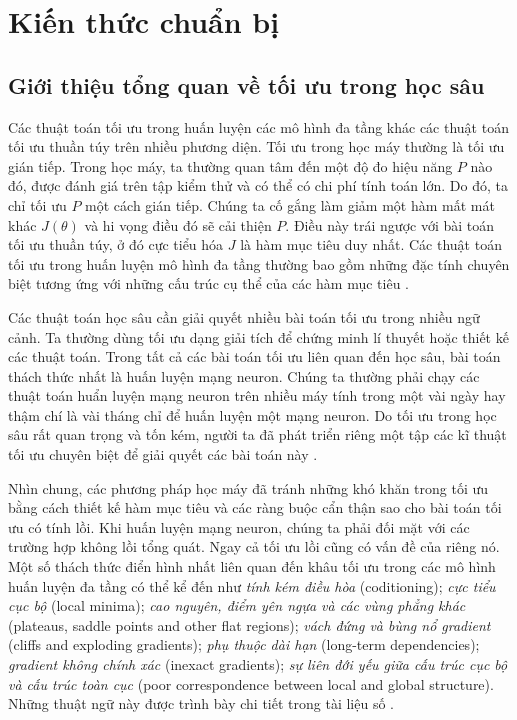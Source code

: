 \documentclass[11pt,oneside,a4paper]{report}
\theoremstyle{definition}
\begin{document}
\tableofcontents
\newpage
\chapter{Kiến thức chuẩn bị}
\section{Giới thiệu tổng quan về tối ưu trong học sâu}

Các thuật toán tối ưu trong huấn luyện các mô hình đa tầng khác các thuật toán tối ưu thuần túy trên nhiều phương diện. Tối ưu trong học máy thường là tối ưu gián tiếp. Trong học máy, ta thường quan tâm đến một độ đo hiệu năng $P$ nào đó, được đánh giá trên tập kiểm thử và có thể có chi phí tính toán lớn. Do đó, ta chỉ tối ưu $P$ một cách gián tiếp. Chúng ta cố gắng làm giảm một hàm mất mát khác $J(\theta)$ và hi vọng điều đó sẽ cải thiện $P$. Điều này trái ngược với bài toán tối ưu thuần túy, ở đó cực tiểu hóa $J$ là hàm mục tiêu duy nhất. Các thuật toán tối ưu trong huấn luyện mô hình đa tầng thường bao gồm những đặc tính chuyên biệt tương ứng với những cấu trúc cụ thể của các hàm mục tiêu \cite{1}.

Các thuật toán học sâu cần giải quyết nhiều bài toán tối ưu trong nhiều ngữ cảnh. Ta thường dùng tối ưu dạng giải tích để chứng minh lí thuyết hoặc thiết kế các thuật toán. Trong tất cả các bài toán tối ưu liên quan đến học sâu, bài toán thách thức nhất là huấn luyện mạng neuron. Chúng ta thường phải chạy các thuật toán huẩn luyện mạng neuron trên nhiều máy tính trong một vài ngày hay thậm chí là vài tháng chỉ để huấn luyện một mạng neuron. Do tối ưu trong học sâu rất quan trọng và tốn kém, người ta đã phát triển riêng một tập các kĩ thuật tối ưu chuyên biệt để giải quyết các bài toán này \cite{1}.

Nhìn chung, các phương pháp học máy đã tránh những khó khăn trong tối ưu bằng cách thiết kế hàm mục tiêu và các ràng buộc cẩn thận sao cho bài toán tối ưu có tính lồi. Khi huấn luyện mạng neuron, chúng ta phải đối mặt với các trường hợp không lồi tổng quát. Ngay cả tối ưu lồi cũng có vấn đề của riêng nó. Một số thách thức điển hình nhất liên quan đến khâu tối ưu trong các mô hình huấn luyện đa tầng có thể kể đến như \textit{tính kém điều hòa} (coditioning); \textit{cực tiểu cục bộ} (local minima); \textit{cao nguyên, điểm yên ngựa và các vùng phẳng khác} (plateaus, saddle points and other flat regions); \textit{vách đứng và bùng nổ gradient} (cliffs and exploding gradients); \textit{phụ thuộc dài hạn} (long-term dependencies); \textit{gradient không chính xác} (inexact gradients); \textit{sự liên đới yếu giữa cấu trúc cục bộ và cấu trúc toàn cục} (poor correspondence between local and global structure). Những thuật ngữ này được trình bày chi tiết trong tài liệu số \cite{1,2}.
\end{document}
